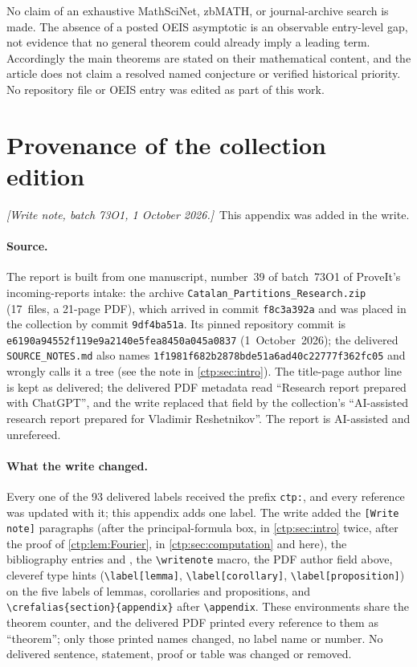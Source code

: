 \documentclass[11pt,a4paper]{article}
\numberwithin{equation}{section}
\theoremstyle{definition}
\theoremstyle{remark}
\newcommand{\writenote}[1]{\par\smallskip\noindent
 \textit{[Write note, batch 73O1, 1 October 2026.]}\ #1\par\smallskip}
\begin{document}
No claim of an exhaustive MathSciNet, zbMATH, or journal-archive search is
made. The absence of a posted OEIS asymptotic is an observable entry-level
gap, not evidence that no general theorem could already imply a leading
term. Accordingly the main theorems are stated on their mathematical
content, and the article does not claim a resolved named conjecture or
verified historical priority. No repository file or OEIS entry was edited
as part of this work.

\section{Provenance of the collection edition}
\label{ctp:app:edition}

\writenote{This appendix was added in the write.}

\paragraph{Source.} The report is built from one manuscript, number~39
of batch~73O1 of ProveIt's incoming-reports intake: the archive
\texttt{Catalan\_Partitions\_Research.zip} (17~files, a 21-page PDF),
which arrived in commit \texttt{f8c3a392a} and was placed in the
collection by commit \texttt{9df4ba51a}. Its pinned repository commit is
\texttt{e6190a94552f119e9a2140e5fea8450a045a0837} (1~October~2026); the
delivered \texttt{SOURCE\_NOTES.md} also names
\texttt{1f1981f682b2878bde51a6ad40c22777f362fc05} and wrongly calls it a
tree (see the note in \cref{ctp:sec:intro}). The title-page author line
is kept as delivered; the delivered PDF metadata read ``Research report
prepared with ChatGPT'', and the write replaced that field by the
collection's ``AI-assisted research report prepared for Vladimir
Reshetnikov''. The report is AI-assisted and unrefereed.

\paragraph{What the write changed.} Every one of the 93 delivered labels
received the prefix \texttt{ctp:}, and every reference was updated with
it; this appendix adds one label. The write added the
\texttt{[Write note]} paragraphs (after the principal-formula box, in
\cref{ctp:sec:intro} twice, after the proof of \cref{ctp:lem:Fourier},
in \cref{ctp:sec:computation} and here), the bibliography entries
\cite{debruijn} and \cite{fabiusH}, the \verb|\writenote| macro, the PDF
author field above, cleveref type hints (\verb|\label[lemma]|,
\verb|\label[corollary]|, \verb|\label[proposition]|) on the five labels
of lemmas, corollaries and propositions, and
\verb|\crefalias{section}{appendix}| after \verb|\appendix|. These
environments share the theorem counter, and the delivered PDF printed
every reference to them as ``theorem''; only those printed names
changed, no label name or number. No delivered sentence, statement,
proof or table was changed or removed.
\end{document}

